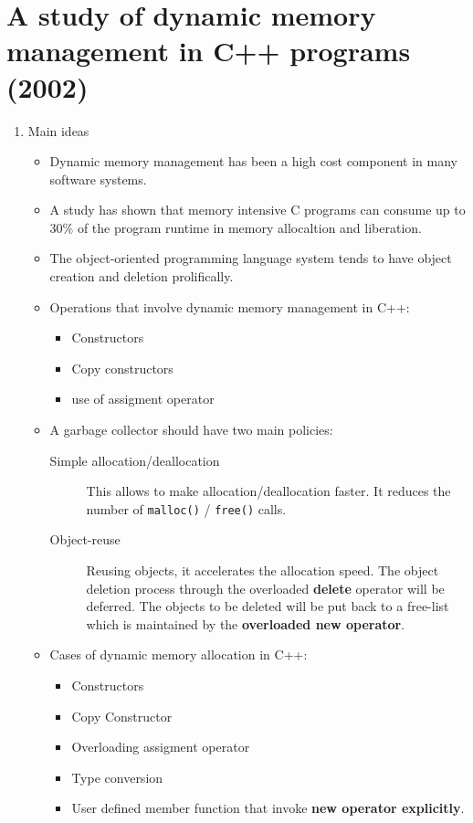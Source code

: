 \documentclass[openany, a4paper]{book}
\theoremstyle{break}
\theoremstyle{example}
\theoremstyle{note}
\theoremstyle{break}
\theoremstyle{exercise}
\begin{document}
\section{A study of dynamic memory management in C++ programs (2002)}
\label{sec:org5537627}
\begin{enumerate}
\item Main ideas
\label{sec:org2e06c97}

\begin{itemize}
\item Dynamic memory management has been a high cost component in many software
systems.
\item A study has shown that memory intensive C programs can consume up to 30\%
of the program runtime in memory allocaltion and liberation.
\item The object-oriented programming language system tends to have object
creation and deletion prolifically.
\item Operations that involve dynamic memory management in C++:
\begin{itemize}
\item Constructors
\item Copy constructors
\item use of assigment operator
\end{itemize}
\item A garbage collector should have two main policies:
\begin{description}
\item[{Simple allocation/deallocation}] This allows to make
allocation/deallocation faster. It reduces the number of \texttt{malloc()} /
\texttt{free()} calls.
\item[{Object-reuse}] Reusing objects, it accelerates the allocation
speed. The object deletion process through the overloaded \textbf{delete}
operator will be deferred. The objects to be deleted will be put back
to a free-list which is maintained by the \textbf{overloaded new operator}.
\end{description}
\item Cases of dynamic memory allocation in C++:
\begin{itemize}
\item Constructors
\item Copy Constructor
\item Overloading assigment operator
\item Type conversion
\item User defined member function that invoke \textbf{new operator explicitly}.
\end{itemize}
\end{itemize}


\end{enumerate}
\end{document}
